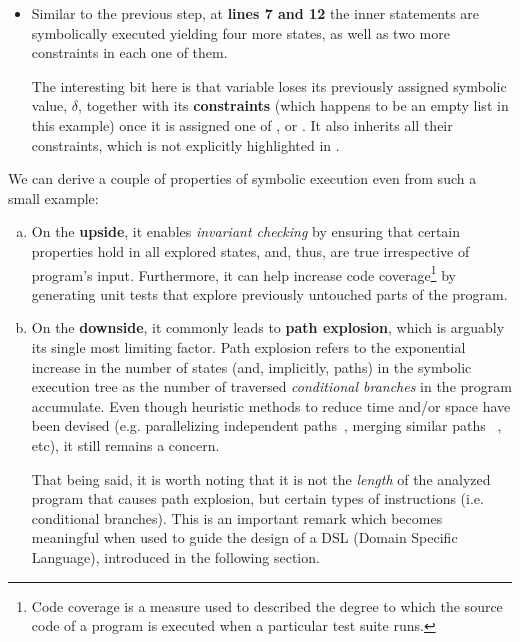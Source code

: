 \begin{itemize}
  \item Similar to the previous step, at \textbf{lines 7 and 12} the inner
     statements are symbolically executed yielding four
    more states, as well as two more constraints in each one of them.

    The interesting bit here is that variable \vmax{} loses its previously
    assigned symbolic value, $\delta$, together with its \textbf{constraints}
    (which happens to be an empty list in this example) once it is assigned one
    of \pa{}, \pb{} or \pc{}.  It also inherits all their constraints, which is
    not explicitly highlighted in .
\end{itemize}

We can derive a couple of properties of symbolic execution even from such a
small example:
\begin{enumerate}[a)]
  \item On the \textbf{upside}, it enables \emph{invariant checking} by
    ensuring that certain properties hold in all explored states, and, thus,
    are true irrespective of program's input.  Furthermore, it can help
    increase code coverage\footnote{Code coverage is a measure used to
    described the degree to which the source code of a program is executed when
    a particular test suite runs.} by generating unit tests that explore
    previously untouched parts of the program.

  \item On the \textbf{downside}, it commonly leads to \textbf{path explosion},
    which is arguably its single most limiting factor. Path explosion refers to
    the exponential increase in the number of states (and, implicitly, paths)
    in the symbolic execution tree as the number of traversed \emph{conditional
    branches} in the program accumulate. Even though heuristic methods to
    reduce time and/or space have been devised (e.g. parallelizing independent
    paths~\cite{staats2010parallel}, merging similar paths
   ~\cite{kuznetsov2012efficient}, etc), it still remains a concern.

    That being said, it is worth noting that it is not the \emph{length} of the
    analyzed program that causes path explosion, but certain types of
    instructions (i.e.  conditional branches).  This is an important remark
    which becomes meaningful when used to guide the design of a DSL (Domain
    Specific Language), introduced in the
    following section.
\end{enumerate}



